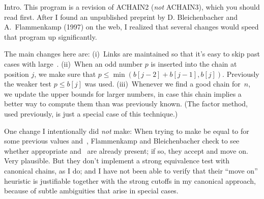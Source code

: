 
\datethis

Intro. This program is a revision of {\mc ACHAIN2} ({\it not\/} {\mc
ACHAIN3}), which you should read first. After I found an unpublished preprint
by D. Bleichenbacher and A.~Flammenkamp (1997) on the web, I realized that
several changes would speed that program up significantly.

The main changes here are:
(i)~Links are maintained so that it's easy to skip past cases
with large~.
(ii)~When an odd number $p$ is inserted into the chain at position $j$,
we make sure that $p\le\min(b[j-2]+b[j-1],b[j])$. Previously the weaker test
$p\le b[j]$ was used.
(iii)~Whenever we find a good chain for~$n$, we update the upper bounds for
larger numbers, in case this chain implies a better way to compute them
than was previously known. (The factor method, used previously, is
just a special case of this technique.)

One change I intentionally did {\it not\/} make: When trying
to make  be equal to  for some previous values  and~,
Flammenkamp and Bleichenbacher check to see whether appropriate
 and~ are already present; if so, they accept  and
move on. Very plausible. But they don't implement a strong equivalence
test with canonical chains, as I do; and I have not been able to
verify that their ``move on'' heuristic is justifiable together with
the strong cutoffs in my canonical approach, because of subtle
ambiguities that arise in special cases.

